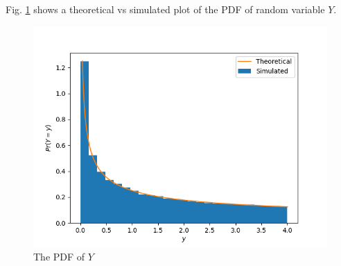 \documentclass[journal,12pt,twocolumn]{IEEEtran}
\begin{document}
Fig. \ref{CDF_Y} shows a theoretical vs simulated plot of the PDF of random variable $Y$.
\begin{figure}[!hbt]
    \centering
	\includegraphics[width=\columnwidth]{./Figures/Figure_1.png}
    \caption{The PDF of $Y$}
    \label{CDF_Y}
\end{figure}
\end{document}
